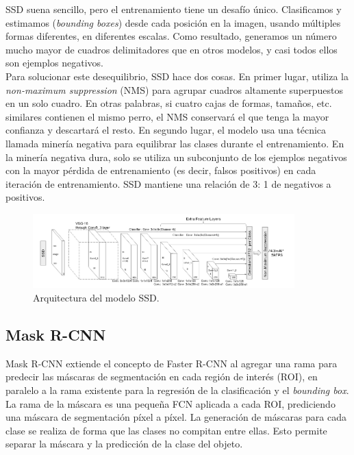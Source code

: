 \documentclass{bmvc2k}
\begin{document}
SSD suena sencillo, pero el entrenamiento tiene un desafío único. Clasificamos y estimamos (\textit{bounding boxes}) desde cada posición en la imagen, usando múltiples formas diferentes, en diferentes escalas. Como resultado, generamos un número mucho mayor de cuadros delimitadores que en otros modelos, y casi todos ellos son ejemplos negativos.\\

Para solucionar este desequilibrio, SSD hace dos cosas. En primer lugar, utiliza la \textit{non-maximum suppression} (NMS) para agrupar cuadros altamente superpuestos en un solo cuadro. En otras palabras, si cuatro cajas de formas, tamaños, etc. similares contienen el mismo perro, el NMS conservará el que tenga la mayor confianza y descartará el resto. En segundo lugar, el modelo usa una técnica llamada minería negativa para equilibrar las clases durante el entrenamiento. En la minería negativa dura, solo se utiliza un subconjunto de los ejemplos negativos con la mayor pérdida de entrenamiento (es decir, falsos positivos) en cada iteración de entrenamiento. SSD mantiene una relación de 3: 1 de negativos a positivos.\\

\begin{figure}
\begin{center}
	\includegraphics[width=0.9\textwidth]{images/ssd.png}
   \caption{Arquitectura del modelo SSD.}
	\label{fig.ssd}
\end{center}
\end{figure}


\subsection{Mask R-CNN}

Mask R-CNN extiende el concepto de Faster R-CNN al agregar una rama para predecir las máscaras de segmentación en cada región de interés (ROI), en paralelo a la rama existente para la regresión de la clasificación y el \textit{bounding box}. La rama de la máscara es una pequeña FCN aplicada
a cada ROI, prediciendo una máscara de segmentación píxel a píxel. La generación de máscaras para cada clase se realiza de forma que las clases no compitan entre ellas. Esto permite separar la máscara y la predicción de la clase del objeto.\\
\end{document}
